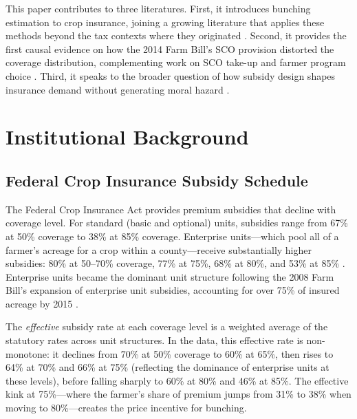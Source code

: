 \documentclass[12pt]{article}
\begin{document}
This paper contributes to three literatures. First, it introduces bunching estimation to crop insurance, joining a growing literature that applies these methods beyond the tax contexts where they originated \citep{chetty2011,kleven2013,diamond2016}. Second, it provides the first causal evidence on how the 2014 Farm Bill's SCO provision distorted the coverage distribution, complementing work on SCO take-up \citep{plastina2018} and farmer program choice \citep{woodard2016}. Third, it speaks to the broader question of how subsidy design shapes insurance demand without generating moral hazard \citep{einav2010,cabral2017}.


\section{Institutional Background}

\subsection{Federal Crop Insurance Subsidy Schedule}

The Federal Crop Insurance Act provides premium subsidies that decline with coverage level. For standard (basic and optional) units, subsidies range from 67\% at 50\% coverage to 38\% at 85\% coverage. Enterprise units---which pool all of a farmer's acreage for a crop within a county---receive substantially higher subsidies: 80\% at 50--70\% coverage, 77\% at 75\%, 68\% at 80\%, and 53\% at 85\% \citep{shields2015}. Enterprise units became the dominant unit structure following the 2008 Farm Bill's expansion of enterprise unit subsidies, accounting for over 75\% of insured acreage by 2015 \citep{woodard2016}.

The \textit{effective} subsidy rate at each coverage level is a weighted average of the statutory rates across unit structures. In the data, this effective rate is non-monotone: it declines from 70\% at 50\% coverage to 60\% at 65\%, then rises to 64\% at 70\% and 66\% at 75\% (reflecting the dominance of enterprise units at these levels), before falling sharply to 60\% at 80\% and 46\% at 85\%. The effective kink at 75\%---where the farmer's share of premium jumps from 31\% to 38\% when moving to 80\%---creates the price incentive for bunching.
\end{document}
